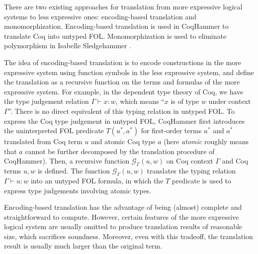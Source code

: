   There are two existing approaches for translation from more expressive
  logical systems to less expressive ones: encoding-based translation and monomorphization.
  Encoding-based translation is used in CoqHammer \cite{Czajka2018HammerFC}
  to translate Coq into untyped FOL. Monomorphization is used to
  eliminate polymorphism in Isabelle Sledgehammer \cite{Blanchette2016HammeringTQ}\cite{Paulson2012ThreeYO}.
  
  The idea of encoding-based translation is to encode
  constructions in the more expressive system using function symbols in the less
  expressive system, and define the translation as a recursive function on the terms and formulas
  of the more expressive system. For example, in the dependent type theory of Coq,
  we have the type judgement relation $\Gamma \vdash x : w$, which means ``$x$ is of
  type $w$ under context $\Gamma$''. There is no direct equivalent of this
  typing relation in untyped FOL. To express the Coq type judgement in untyped FOL, 
  CoqHammer first introduces the uninterpreted FOL predicate $T(u^*, a^*)$ for
  first-order terms $u^*$ and $a^*$ translated from Coq term $u$ and atomic Coq type $a$
  (here \textit{atomic} roughly means that $a$ cannot be
  further decomposed by the translation procedure of CoqHammer). Then, a recursive function
  $\mathcal{G}_\Gamma(u, w)$ on Coq context $\Gamma$ and Coq terms $u, w$ is defined.
  The function $\mathcal{G}_\Gamma(u, w)$ translates the typing relation $\Gamma \vdash u : w$ into an untyped FOL formula,
  in which the $T$ predicate is used to express type judgements involving atomic types.
  
  Encoding-based translation has the advantage of being (almost) complete
  and straightforward to compute. However, certain features of the more expressive
  logical system are usually omitted to produce translation results of reasonable size,
  which sacrifices soundness. Moreover, even with this tradeoff, the translation result is usually much larger
  than the original term.

